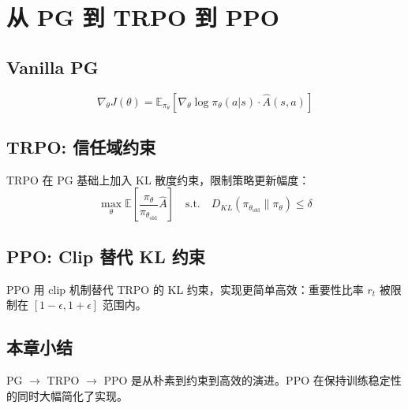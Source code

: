\section{从 PG 到 TRPO 到 PPO}
\subsection{Vanilla PG}
$$\nabla_\theta J(\theta) = \mathbb{E}_{\pi_\theta}\left[\nabla_\theta \log \pi_\theta(a|s) \cdot \hat{A}(s,a)\right]$$

\subsection{TRPO: 信任域约束}
TRPO 在 PG 基础上加入 KL 散度约束，限制策略更新幅度：
$$\max_\theta \mathbb{E}\left[\frac{\pi_\theta}{\pi_{\theta_\text{old}}} \hat{A}\right] \quad \text{s.t.} \quad D_{KL}(\pi_{\theta_\text{old}} \| \pi_\theta) \le \delta$$

\subsection{PPO: Clip 替代 KL 约束}
PPO 用 clip 机制替代 TRPO 的 KL 约束，实现更简单高效：重要性比率 $r_t$ 被限制在 $[1{-}\epsilon, 1{+}\epsilon]$ 范围内。

\subsection{本章小结}
PG $\to$ TRPO $\to$ PPO 是从朴素到约束到高效的演进。PPO 在保持训练稳定性的同时大幅简化了实现。

